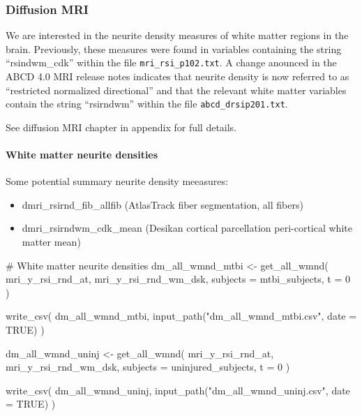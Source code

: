 \documentclass[
  letterpaper,
  DIV=11,
  numbers=noendperiod]{scrreprt}
\let\oldparagraph\paragraph
\renewcommand{\paragraph}[1]{\oldparagraph{#1}\mbox{}}
\newenvironment{Shaded}{\begin{snugshade}}{\end{snugshade}}
\newcommand{\AttributeTok}[1]{\textcolor[rgb]{0.40,0.45,0.13}{#1}}
\newcommand{\CommentTok}[1]{\textcolor[rgb]{0.37,0.37,0.37}{#1}}
\newcommand{\ConstantTok}[1]{\textcolor[rgb]{0.56,0.35,0.01}{#1}}
\newcommand{\DecValTok}[1]{\textcolor[rgb]{0.68,0.00,0.00}{#1}}
\newcommand{\FunctionTok}[1]{\textcolor[rgb]{0.28,0.35,0.67}{#1}}
\newcommand{\NormalTok}[1]{\textcolor[rgb]{0.00,0.23,0.31}{#1}}
\newcommand{\OtherTok}[1]{\textcolor[rgb]{0.00,0.23,0.31}{#1}}
\newcommand{\StringTok}[1]{\textcolor[rgb]{0.13,0.47,0.30}{#1}}
\providecommand{\tightlist}{%
  \setlength{\itemsep}{0pt}\setlength{\parskip}{0pt}}\usepackage{longtable,booktabs,array}
\begin{document}
\subsubsection{Diffusion MRI}\label{diffusion-mri}

We are interested in the neurite density measures of white matter
regions in the brain. Previously, these measures were found in variables
containing the string ``rsindwm\_cdk'' within the file
\texttt{mri\_rsi\_p102.txt}. A change anounced in the ABCD 4.0 MRI
release notes indicates that neurite density is now referred to as
``restricted normalized directional'' and that the relevant white matter
variables contain the string ``rsirndwm'' within the file
\texttt{abcd\_drsip201.txt}.

See diffusion MRI chapter in appendix for full details.

\paragraph{White matter neurite
densities}\label{white-matter-neurite-densities}

Some potential summary neurite density meeasures:

\begin{itemize}
\tightlist
\item
  dmri\_rsirnd\_fib\_allfib (AtlasTrack fiber segmentation, all fibers)
\item
  dmri\_rsirndwm\_cdk\_mean (Desikan cortical parcellation peri-cortical
  white matter mean)
\end{itemize}

\begin{Shaded}
\begin{Highlighting}[]
\CommentTok{\# White matter neurite densities}
\NormalTok{dm\_all\_wmnd\_mtbi }\OtherTok{\textless{}{-}} \FunctionTok{get\_all\_wmnd}\NormalTok{(}
\NormalTok{    mri\_y\_rsi\_rnd\_at,}
\NormalTok{    mri\_y\_rsi\_rnd\_wm\_dsk,}
    \AttributeTok{subjects =}\NormalTok{ mtbi\_subjects,}
    \AttributeTok{t =} \DecValTok{0}
\NormalTok{)}

\FunctionTok{write\_csv}\NormalTok{(}
\NormalTok{    dm\_all\_wmnd\_mtbi, }\FunctionTok{input\_path}\NormalTok{(}\StringTok{"dm\_all\_wmnd\_mtbi.csv"}\NormalTok{, }\AttributeTok{date =} \ConstantTok{TRUE}\NormalTok{)}
\NormalTok{)}

\NormalTok{dm\_all\_wmnd\_uninj }\OtherTok{\textless{}{-}} \FunctionTok{get\_all\_wmnd}\NormalTok{(}
\NormalTok{    mri\_y\_rsi\_rnd\_at,}
\NormalTok{    mri\_y\_rsi\_rnd\_wm\_dsk,}
    \AttributeTok{subjects =}\NormalTok{ uninjured\_subjects,}
    \AttributeTok{t =} \DecValTok{0}
\NormalTok{)}

\FunctionTok{write\_csv}\NormalTok{(}
\NormalTok{    dm\_all\_wmnd\_uninj, }\FunctionTok{input\_path}\NormalTok{(}\StringTok{"dm\_all\_wmnd\_uninj.csv"}\NormalTok{, }\AttributeTok{date =} \ConstantTok{TRUE}\NormalTok{)}
\NormalTok{)}
\end{Highlighting}
\end{Shaded}
\end{document}
